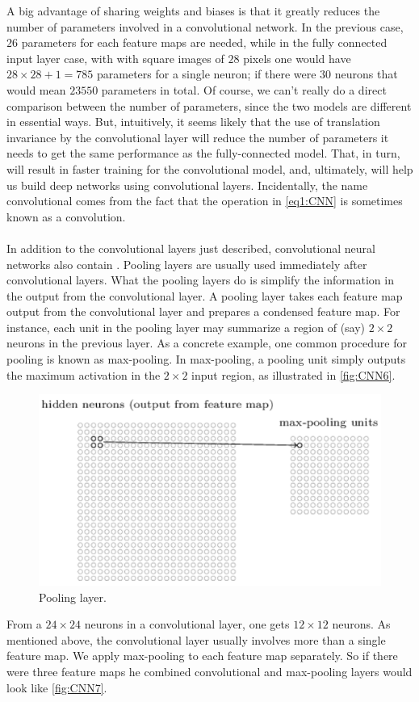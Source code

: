 A big advantage of sharing weights and biases is that it greatly reduces the number of parameters involved in a convolutional network. In the previous case, $26$ parameters for each feature maps are needed, while in the fully connected input layer case, with with square images of $28$ pixels one would have $28\times 28+1 = 785$ parameters for a single neuron; if there were $30$ neurons that would mean $23550$ parameters in total.
Of course, we can't really do a direct comparison between the number of parameters, since the two models are different in essential ways. But, intuitively, it seems likely that the use of translation invariance by the convolutional layer will reduce the number of parameters it needs to get the same performance as the fully-connected model. That, in turn, will result in faster training for the convolutional model, and, ultimately, will help us build deep networks using convolutional layers. Incidentally, the name convolutional comes from the fact that the operation in \autoref{eq1:CNN} is sometimes known as a convolution. 

\paragraph{} In addition to the convolutional layers just described, convolutional neural networks also contain . Pooling layers are usually used immediately after convolutional layers. What the pooling layers do is simplify the information in the output from the convolutional layer. A pooling layer takes each feature map output from the convolutional layer and prepares a condensed feature map. For instance, each unit in the pooling layer may summarize a region of (say) $2\times 2$ neurons in the previous layer. As a concrete example, one common procedure for pooling is known as max-pooling. In max-pooling, a pooling unit simply outputs the maximum activation in the $2\times 2$ input region, as illustrated in \autoref{fig:CNN6}.

\begin{figure}
\centering
\includegraphics[scale=0.5]{img/CNN6}
\caption{Pooling layer.}
\label{fig:CNN6}
\end{figure}
From a $24\times 24$ neurons in a convolutional layer, one gets $12\times 12$ neurons. As mentioned above, the convolutional layer usually involves more than a single feature map. We apply max-pooling to each feature map separately. So if there were three feature maps he combined convolutional and max-pooling layers would look like \autoref{fig:CNN7}.

